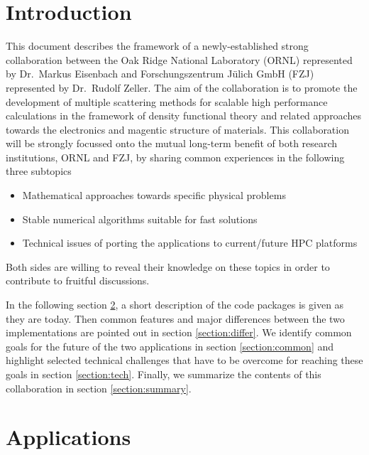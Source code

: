\documentclass{llncs}
\begin{document}
\section{Introduction} \label{section:intro}
This document describes the framework of a newly-established strong collaboration
between the Oak Ridge National Laboratory (ORNL) represented by Dr.~Markus Eisenbach
and Forschungszentrum J\"ulich GmbH (FZJ) represented by Dr.~Rudolf Zeller.
The aim of the collaboration is to promote the development of multiple scattering methods
for scalable high performance calculations in the framework of density functional theory
and related approaches towards the electronics and magentic structure of materials.
This collaboration will be strongly focussed onto the mutual long-term benefit of both research institutions, 
ORNL and FZJ, by sharing common experiences in the following three subtopics
\begin{itemize}
 \item Mathematical approaches towards specific physical problems  
 \item Stable numerical algorithms suitable for fast solutions
 \item Technical issues of porting the applications to current/future HPC platforms
\end{itemize}
Both sides are willing to reveal their knowledge on these topics in order to
contribute to fruitful discussions.


In the following section \ref{section:apps}, a short description of the code packages is given as they are today.
Then common features and major differences between the two implementations are pointed out in section \ref{section:differ}.
We identify common goals for the future of the two applications in section \ref{section:common}
and highlight selected technical challenges that have to be overcome for reaching these goals in section \ref{section:tech}.
Finally, we summarize the contents of this collaboration in section \ref{section:summary}.

\section{Applications} \label{section:apps}
\end{document}
